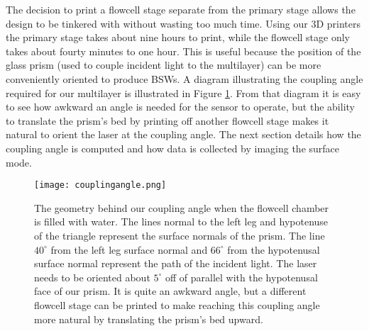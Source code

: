 The decision to print a flowcell stage separate from the primary stage allows the design to be tinkered with without wasting too much time. Using our 3D printers the primary stage takes about nine hours to print, while the flowcell stage only takes about fourty minutes to one hour. This is useful because the position of the glass prism (used to couple incident light to the multilayer) can be more conveniently oriented to produce BSWs. A diagram illustrating the coupling angle required for our multilayer is illustrated in Figure \ref{fig:couplingangle}. From that diagram it is easy to see how awkward an angle is needed for the sensor to operate, but the ability to translate the prism's bed by printing off another flowcell stage makes it natural to orient the laser at the coupling angle. The next section details how the coupling angle is computed and how data is collected by imaging the surface mode.

\begin{figure}[t!]
\begin{center}
    \texttt{[image: couplingangle.png]}
    \caption{The geometry behind our coupling angle when the flowcell chamber is filled with water. The lines normal to the left leg and hypotenuse of the triangle represent the surface normals of the prism. The line $40^\circ$ from the left leg surface normal and $66^\circ$ from the hypotenusal surface normal represent the path of the incident light. The laser needs to be oriented about $5^\circ$ off of parallel with the hypotenusal face of our prism. It is quite an awkward angle, but a different flowcell stage can be printed to make reaching this coupling angle more natural by translating the prism's bed upward.}
    \label{fig:couplingangle}
\end{center}
\end{figure}